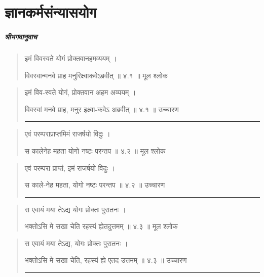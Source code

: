 \chapter{\sanskrit ज्ञानकर्मसंन्यासयोग}

\sanskrit

\paragraph{\sanskrit श्रीभगवानुवाच}

\begin{quotation}
इमं विवस्वते योगं प्रोक्तवानहमव्ययम्‌  ।  

विवस्वान्मनवे प्राह मनुरिक्ष्वाकवेऽब्रवीत्‌  ॥ ४.१ ॥  मूल श्लोक
\end{quotation}

\begin{quotation}

इमं विव-स्वते योगं, प्रोक्तवान अहम अव्ययम्‌  ।  

विवस्वां मनवे प्राह, मनुर इक्ष्वा-कवेऽ अब्रवीत्‌  ॥ ४.१ ॥  उच्चारण

\noindent\rule{16cm}{0.4pt} 
\end{quotation}


\begin{quotation}

एवं परम्पराप्राप्तमिमं राजर्षयो विदुः  ।  

स कालेनेह महता योगो नष्टः परन्तप   ॥ ४.२ ॥  मूल श्लोक
\end{quotation}

\begin{quotation}

एवं परम्परा प्राप्तं,  इमं राजर्षयो विदुः  ।  

स काले-नेह महता, योगो नष्टः परन्तप  ॥ ४.२ ॥  उच्चारण

\noindent\rule{16cm}{0.4pt} 
\end{quotation}


\begin{quotation}

स एवायं मया तेऽद्य योगः प्रोक्तः पुरातनः  ।  

भक्तोऽसि मे सखा चेति रहस्यं ह्येतदुत्तमम्‌  ॥ ४.३ ॥  मूल श्लोक
\end{quotation}

\begin{quotation}

स एवायं मया तेऽद्य, योगः प्रोक्तः पुरातनः  ।  

भक्तोऽसि मे सखा चेति, रहस्यं ह्ये एतद उत्तमम्‌  ॥ ४.३ ॥  उच्चारण

\noindent\rule{16cm}{0.4pt} 
\end{quotation}

